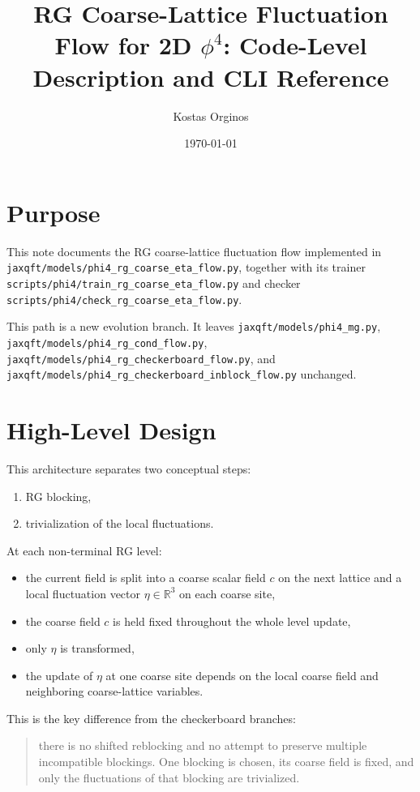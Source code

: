 \documentclass[11pt]{article}
\title{RG Coarse-Lattice Fluctuation Flow for 2D $\phi^4$: Code-Level Description and CLI Reference}
\author{Kostas Orginos}
\date{\today}
\begin{document}
\maketitle

\section{Purpose}

This note documents the RG coarse-lattice fluctuation flow implemented in
\texttt{jaxqft/models/phi4\_rg\_coarse\_eta\_flow.py}, together with its
trainer
\texttt{scripts/phi4/train\_rg\_coarse\_eta\_flow.py}
and checker
\texttt{scripts/phi4/check\_rg\_coarse\_eta\_flow.py}.

This path is a new evolution branch. It leaves
\texttt{jaxqft/models/phi4\_mg.py},
\texttt{jaxqft/models/phi4\_rg\_cond\_flow.py},
\texttt{jaxqft/models/phi4\_rg\_checkerboard\_flow.py}, and
\texttt{jaxqft/models/phi4\_rg\_checkerboard\_inblock\_flow.py} unchanged.

\section{High-Level Design}

This architecture separates two conceptual steps:
\begin{enumerate}
\item RG blocking,
\item trivialization of the local fluctuations.
\end{enumerate}

At each non-terminal RG level:
\begin{itemize}
\item the current field is split into a coarse scalar field $c$ on the next
lattice and a local fluctuation vector $\eta\in\mathbb{R}^3$ on each coarse
site,
\item the coarse field $c$ is held fixed throughout the whole level update,
\item only $\eta$ is transformed,
\item the update of $\eta$ at one coarse site depends on the local coarse
field and neighboring coarse-lattice variables.
\end{itemize}

This is the key difference from the checkerboard branches:
\begin{quote}
there is no shifted reblocking and no attempt to preserve multiple incompatible
blockings. One blocking is chosen, its coarse field is fixed, and only the
fluctuations of that blocking are trivialized.
\end{quote}
\end{document}
